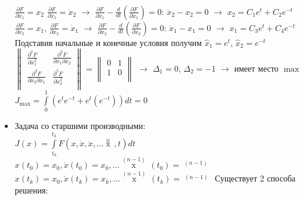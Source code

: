 \documentclass[preprint,russian,a5paper,10pt,twoside]{ncc}
\begin{document}
\begin{itemize}
\\$\frac{\partial F}{\partial {{x}_{1}}}={{x}_{2}}$ $\frac{\partial F}{\partial {{{\dot{x}}}_{1}}}={{\dot{x}}_{2}}$ $\to $ $\frac{\partial F}{\partial {{x}_{1}}}-\frac{d}{dt}\left( \frac{\partial F}{\partial {{{\dot{x}}}_{1}}} \right)=0$: ${{\ddot{x}}_{2}}-{{x}_{2}}=0$ $\to $ ${{x}_{2}}={{C}_{1}}{{e}^{t}}+{{C}_{2}}{{e}^{-t}}$
\\$\frac{\partial F}{\partial {{x}_{2}}}={{x}_{1}}$, $\frac{\partial F}{\partial {{{\dot{x}}}_{2}}}={{\dot{x}}_{1}}$ $\to$ $\frac{\partial F}{\partial {{x}_{2}}}-\frac{d}{dt}\left( \frac{\partial F}{\partial {{{\dot{x}}}_{2}}} \right)=0$: ${{\ddot{x}}_{1}}-{{x}_{1}}=0$ $\to$ ${{x}_{1}}={{C}_{3}}{{e}^{t}}+{{C}_{4}}{{e}^{-t}}$
\\Подставив начальные и конечные условия получим ${{\hat{x}}_{1}}={{e}^{t}}$, ${{\hat{x}}_{2}}={{e}^{-t}}$
$\left\| \begin{matrix}
   \frac{{{\partial }^{2}}F}{\partial \dot{x}_{1}^{2}} & \frac{{{\partial }^{2}}F}{\partial {{{\dot{x}}}_{1}}\partial {{{\dot{x}}}_{2}}}  \\
   \frac{{{\partial }^{2}}F}{\partial {{{\dot{x}}}_{2}}\partial {{{\dot{x}}}_{1}}} & \frac{{{\partial }^{2}}F}{\partial \dot{x}_{2}^{2}}  \\
\end{matrix} \right\|=\left\| \begin{matrix}
   0 & 1  \\
   1 & 0  \\
\end{matrix} \right\|$ $\to $  ${{\Delta }_{1}}=0$, ${{\Delta }_{2}}=-1$ $\to $ имеет место \underline{$\max $}
\\${{J}_{\max }}=\int\limits_{0}^{1}{\left( {{e}^{t}}{{e}^{-t}}+{{e}^{t}}\left( {{e}^{-t}} \right) \right)}dt=0$
\item Задача со старшими производными:
\\$J\left( x \right)=\int\limits_{{{t}_{0}}}^{{{t}_{k}}}{F\left( x,\dot{x},\ddot{x},...\overset{n}{\mathop{x}}\,,t \right)}dt$
\\$x\left( {{t}_{0}} \right)={{x}_{0}},\dot{x}\left( {{t}_{0}} \right)={{x}_{0}},...\overset{\left( n-1 \right)}{\mathop{x}}\,\left( {{t}_{0}} \right)=\overset{\left( n-1 \right)}{\mathop{{{x}_{0}}}}\,$
\\$x\left( {{t}_{k}} \right)={{x}_{0}},\dot{x}\left( {{t}_{k}} \right)={{x}_{k}},...\overset{\left( n-1 \right)}{\mathop{x}}\,\left( {{t}_{k}} \right)=\overset{\left( n-1 \right)}{\mathop{{{x}_{k}}}}\,$
Существует 2 способа решения:

\end{itemize}
\end{document}
